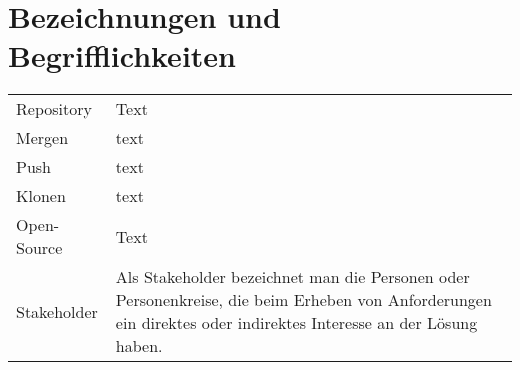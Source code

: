 \chapter*{Bezeichnungen und Begrifflichkeiten}

\begin{tabular}{lp{11cm}}
Repository  & Text \\
Mergen & text \\
Push & text \\
Klonen & text \\
Open-Source & Text \\
Stakeholder & Als Stakeholder bezeichnet man die Personen oder Personenkreise, die beim Erheben von Anforderungen ein direktes oder indirektes Interesse an der Lösung haben. 
\end{tabular}